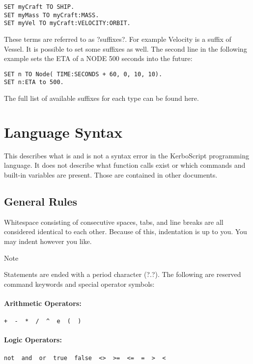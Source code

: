 \begin{Verbatim}[frame=single]
SET myCraft TO SHIP.
SET myMass TO myCraft:MASS.
SET myVel TO myCraft:VELOCITY:ORBIT.
\end{Verbatim}

These terms are referred to as ?suffixes?. For example Velocity is a suffix of Vessel. It is possible to set some suffixes as well. The second line in the following example sets the ETA of a NODE 500 seconds into the future:

\begin{Verbatim}[frame=single]
SET n TO Node( TIME:SECONDS + 60, 0, 10, 10).
SET n:ETA to 500.
\end{Verbatim}

The full list of available suffixes for each type can be found here.
	\section{Language Syntax}%
	This describes what is and is not a syntax error in the KerboScript programming language. It does not describe what function calls exist or which commands and built-in variables are present. Those are contained in other documents.
	\subsection{General Rules}
Whitespace consisting of consecutive spaces, tabs, and line breaks are all considered identical to each other. Because of this, indentation is up to you. You may indent however you like.

Note

Statements are ended with a period character (?.?).
The following are reserved command keywords and special operator symbols:

\paragraph{Arithmetic Operators:}

\begin{Verbatim}[frame=single]
+  -  *  /  ^  e  (  )
\end{Verbatim}

\paragraph{Logic Operators:}

\begin{Verbatim}[frame=single]
not  and  or  true  false  <>  >=  <=  =  >  <
\end{Verbatim}


